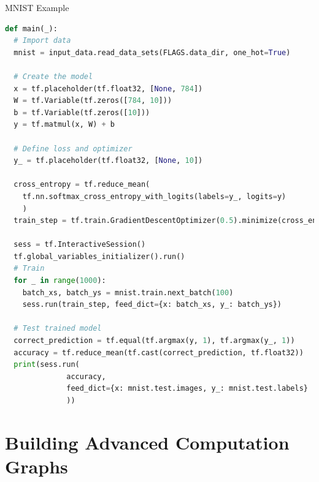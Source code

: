 \documentclass[]{beamer}
\begin{document}
\begin{frame}[fragile]{MNIST Example}

\lstset{style=mystyle2}

\begin{lstlisting}[language=python]
def main(_):
  # Import data
  mnist = input_data.read_data_sets(FLAGS.data_dir, one_hot=True)

  # Create the model
  x = tf.placeholder(tf.float32, [None, 784])
  W = tf.Variable(tf.zeros([784, 10]))
  b = tf.Variable(tf.zeros([10]))
  y = tf.matmul(x, W) + b

  # Define loss and optimizer
  y_ = tf.placeholder(tf.float32, [None, 10])

  cross_entropy = tf.reduce_mean(
    tf.nn.softmax_cross_entropy_with_logits(labels=y_, logits=y)
    )
  train_step = tf.train.GradientDescentOptimizer(0.5).minimize(cross_entropy)

  sess = tf.InteractiveSession()
  tf.global_variables_initializer().run()
  # Train
  for _ in range(1000):
    batch_xs, batch_ys = mnist.train.next_batch(100)
    sess.run(train_step, feed_dict={x: batch_xs, y_: batch_ys})

  # Test trained model
  correct_prediction = tf.equal(tf.argmax(y, 1), tf.argmax(y_, 1))
  accuracy = tf.reduce_mean(tf.cast(correct_prediction, tf.float32))
  print(sess.run(
              accuracy, 
              feed_dict={x: mnist.test.images, y_: mnist.test.labels}
              ))
\end{lstlisting}

\lstset{style=mystyle}

\end{frame}

\section{Building Advanced Computation Graphs}
\end{document}
